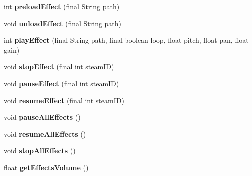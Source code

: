\begin{DoxyCompactItemize}
int {\bfseries preload\+Effect} (final String path)
\item 
\mbox{\label{classorg_1_1cocos2dx_1_1lib_1_1Cocos2dxSound_a79a0a0c1bd6e4c577edb2a379a6c5bb6}} 
void {\bfseries unload\+Effect} (final String path)
\item 
\mbox{\label{classorg_1_1cocos2dx_1_1lib_1_1Cocos2dxSound_af484b4112bba866a689c4a06fd5348ea}} 
int {\bfseries play\+Effect} (final String path, final boolean loop, float pitch, float pan, float gain)
\item 
\mbox{\label{classorg_1_1cocos2dx_1_1lib_1_1Cocos2dxSound_a8997653d75fd04b857c796f0e04327e0}} 
void {\bfseries stop\+Effect} (final int steam\+ID)
\item 
\mbox{\label{classorg_1_1cocos2dx_1_1lib_1_1Cocos2dxSound_a0098df4c5ad674b8f9445a113c8a6072}} 
void {\bfseries pause\+Effect} (final int steam\+ID)
\item 
\mbox{\label{classorg_1_1cocos2dx_1_1lib_1_1Cocos2dxSound_a56440b929e50100b720cc1c210afab27}} 
void {\bfseries resume\+Effect} (final int steam\+ID)
\item 
\mbox{\label{classorg_1_1cocos2dx_1_1lib_1_1Cocos2dxSound_a897fda1205b6dc9018f2eacd525bff9d}} 
void {\bfseries pause\+All\+Effects} ()
\item 
\mbox{\label{classorg_1_1cocos2dx_1_1lib_1_1Cocos2dxSound_a5a5aa157a5e09589314a98e0b5d026d9}} 
void {\bfseries resume\+All\+Effects} ()
\item 
\mbox{\label{classorg_1_1cocos2dx_1_1lib_1_1Cocos2dxSound_a77b4df6c2584254bc417bc41f72b37cd}} 
void {\bfseries stop\+All\+Effects} ()
\item 
\mbox{\label{classorg_1_1cocos2dx_1_1lib_1_1Cocos2dxSound_ad557b44b782dfd3b0b85c37e3cb7daed}} 
float {\bfseries get\+Effects\+Volume} ()

\end{DoxyCompactItemize}
